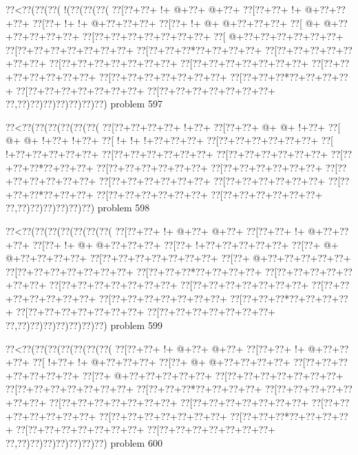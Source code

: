 \vbox{\vbox{\goo
\0??<\0??(\0??(\0??(\- !(\0??(\0??(\0??(
\0??[\0??+\0??+\- !+\- @+\0??+\- @+\0??+
\0??[\0??+\0??+\- !+\- @+\0??+\0??+\0??+
\0??[\0??+\- !+\- !+\- @+\0??+\0??+\0??+
\0??[\0??+\- !+\- @+\- @+\0??+\0??+\0??+
\0??[\- @+\- @+\0??+\0??+\0??+\0??+\0??+
\0??[\0??+\0??+\0??+\0??+\0??+\0??+\0??+
\0??[\- @+\0??+\0??+\0??+\0??+\0??+\0??+
\0??[\0??+\0??+\0??+\0??+\0??+\0??+\0??+
\0??[\0??+\0??+\0??*\0??+\0??+\0??+\0??+
\0??[\0??+\0??+\0??+\0??+\0??+\0??+\0??+
\0??[\0??+\0??+\0??+\0??+\0??+\0??+\0??+
\0??[\0??+\0??+\0??+\0??+\0??+\0??+\0??+
\0??[\0??+\0??+\0??+\0??+\0??+\0??+\0??+
\0??[\0??+\0??+\0??+\0??+\0??+\0??+\0??+
\0??[\0??+\0??+\0??*\0??+\0??+\0??+\0??+
\0??[\0??+\0??+\0??+\0??+\0??+\0??+\0??+
\0??[\0??+\0??+\0??+\0??+\0??+\0??+\0??+
\0??,\0??)\0??)\0??)\0??)\0??)\0??)\0??)
}
\hfil problem 597\hfil\break
}

\vbox{\vbox{\goo
\0??<\0??(\0??(\0??(\0??(\0??(\0??(
\0??[\0??+\0??+\0??+\0??+\- !+\0??+
\0??[\0??+\0??+\- @+\- @+\- !+\0??+
\0??[\- @+\- @+\- !+\0??+\- !+\0??+
\0??[\- !+\- !+\- !+\0??+\0??+\0??+
\0??[\0??+\0??+\0??+\0??+\0??+\0??+
\0??[\- !+\0??+\0??+\0??+\0??+\0??+
\0??[\0??+\0??+\0??+\0??+\0??+\0??+
\0??[\0??+\0??+\0??+\0??+\0??+\0??+
\0??[\0??+\0??+\0??*\0??+\0??+\0??+
\0??[\0??+\0??+\0??+\0??+\0??+\0??+
\0??[\0??+\0??+\0??+\0??+\0??+\0??+
\0??[\0??+\0??+\0??+\0??+\0??+\0??+
\0??[\0??+\0??+\0??+\0??+\0??+\0??+
\0??[\0??+\0??+\0??+\0??+\0??+\0??+
\0??[\0??+\0??+\0??*\0??+\0??+\0??+
\0??[\0??+\0??+\0??+\0??+\0??+\0??+
\0??[\0??+\0??+\0??+\0??+\0??+\0??+
\0??,\0??)\0??)\0??)\0??)\0??)\0??)
}
\hfil problem 598\hfil\break
}

\vbox{\vbox{\goo
\0??<\0??(\0??(\0??(\0??(\0??(\0??(\0??(
\0??[\0??+\0??+\- !+\- @+\0??+\- @+\0??+
\0??[\0??+\0??+\- !+\- @+\0??+\0??+\0??+
\0??[\0??+\- !+\- @+\- @+\0??+\0??+\0??+
\0??[\0??+\- !+\0??+\0??+\0??+\0??+\0??+
\0??[\0??+\- @+\- @+\0??+\0??+\0??+\0??+
\0??[\0??+\0??+\0??+\0??+\0??+\0??+\0??+
\0??[\0??+\- @+\0??+\0??+\0??+\0??+\0??+
\0??[\0??+\0??+\0??+\0??+\0??+\0??+\0??+
\0??[\0??+\0??+\0??*\0??+\0??+\0??+\0??+
\0??[\0??+\0??+\0??+\0??+\0??+\0??+\0??+
\0??[\0??+\0??+\0??+\0??+\0??+\0??+\0??+
\0??[\0??+\0??+\0??+\0??+\0??+\0??+\0??+
\0??[\0??+\0??+\0??+\0??+\0??+\0??+\0??+
\0??[\0??+\0??+\0??+\0??+\0??+\0??+\0??+
\0??[\0??+\0??+\0??*\0??+\0??+\0??+\0??+
\0??[\0??+\0??+\0??+\0??+\0??+\0??+\0??+
\0??[\0??+\0??+\0??+\0??+\0??+\0??+\0??+
\0??,\0??)\0??)\0??)\0??)\0??)\0??)\0??)
}
\hfil problem 599\hfil\break
}

\vbox{\vbox{\goo
\0??<\0??(\0??(\0??(\0??(\0??(\0??(\0??(
\0??[\0??+\0??+\- !+\- @+\0??+\- @+\0??+
\0??[\0??+\0??+\- !+\- @+\0??+\0??+\0??+
\0??[\- !+\0??+\- !+\- @+\0??+\0??+\0??+
\0??[\0??+\- @+\- @+\0??+\0??+\0??+\0??+
\0??[\0??+\0??+\0??+\0??+\0??+\0??+\0??+
\0??[\0??+\- @+\0??+\0??+\0??+\0??+\0??+
\0??[\0??+\0??+\0??+\0??+\0??+\0??+\0??+
\0??[\0??+\0??+\0??+\0??+\0??+\0??+\0??+
\0??[\0??+\0??+\0??*\0??+\0??+\0??+\0??+
\0??[\0??+\0??+\0??+\0??+\0??+\0??+\0??+
\0??[\0??+\0??+\0??+\0??+\0??+\0??+\0??+
\0??[\0??+\0??+\0??+\0??+\0??+\0??+\0??+
\0??[\0??+\0??+\0??+\0??+\0??+\0??+\0??+
\0??[\0??+\0??+\0??+\0??+\0??+\0??+\0??+
\0??[\0??+\0??+\0??*\0??+\0??+\0??+\0??+
\0??[\0??+\0??+\0??+\0??+\0??+\0??+\0??+
\0??[\0??+\0??+\0??+\0??+\0??+\0??+\0??+
\0??,\0??)\0??)\0??)\0??)\0??)\0??)\0??)
}
\hfil problem 600\hfil\break
}

